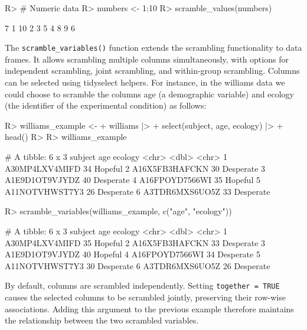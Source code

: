 \documentclass[
]{jss}
\begin{document}
\begin{CodeChunk}
\begin{CodeInput}
R> # Numeric data
R> numbers <- 1:10
R> scramble_values(numbers)
\end{CodeInput}
\begin{CodeOutput}
 [1]  7  1 10  2  3  5  4  8  9  6
\end{CodeOutput}
\end{CodeChunk}

The \texttt{scramble\_variables()} function extends the scrambling
functionality to data frames. It allows scrambling multiple columns
simultaneously, with options for independent scrambling, joint
scrambling, and within-group scrambling. Columns can be selected using
tidyselect helpers. For instance, in the williams data we could choose
to scramble the columns age (a demographic variable) and ecology (the
identifier of the experimental condition) as follows:

\begin{CodeChunk}
\begin{CodeInput}
R> williams_example <-
+     williams |>
+     select(subject, age, ecology) |> 
+     head()
R> 
R> williams_example
\end{CodeInput}
\begin{CodeOutput}
# A tibble: 6 x 3
  subject          age ecology  
  <chr>          <dbl> <chr>    
1 A30MP4LXV4MIFD    34 Hopeful  
2 A16X5FB3HAFCKN    30 Desperate
3 A1E9D1OT9VJYDZ    40 Desperate
4 A16FPOYD7566WI    35 Hopeful  
5 A11NOTVHWST7Y3    26 Desperate
6 A3TDR6MXS6UO5Z    33 Desperate
\end{CodeOutput}
\begin{CodeInput}
R> scramble_variables(williams_example, c("age", "ecology"))
\end{CodeInput}
\begin{CodeOutput}
# A tibble: 6 x 3
  subject          age ecology  
  <chr>          <dbl> <chr>    
1 A30MP4LXV4MIFD    35 Hopeful  
2 A16X5FB3HAFCKN    33 Desperate
3 A1E9D1OT9VJYDZ    40 Hopeful  
4 A16FPOYD7566WI    34 Desperate
5 A11NOTVHWST7Y3    30 Desperate
6 A3TDR6MXS6UO5Z    26 Desperate
\end{CodeOutput}
\end{CodeChunk}

By default, columns are scrambled independently. Setting
\texttt{together\ =\ TRUE} causes the selected columns to be scrambled
jointly, preserving their row-wise associations. Adding this argument to
the previous example therefore maintains the relationship between the
two scrambled variables.
\end{document}

